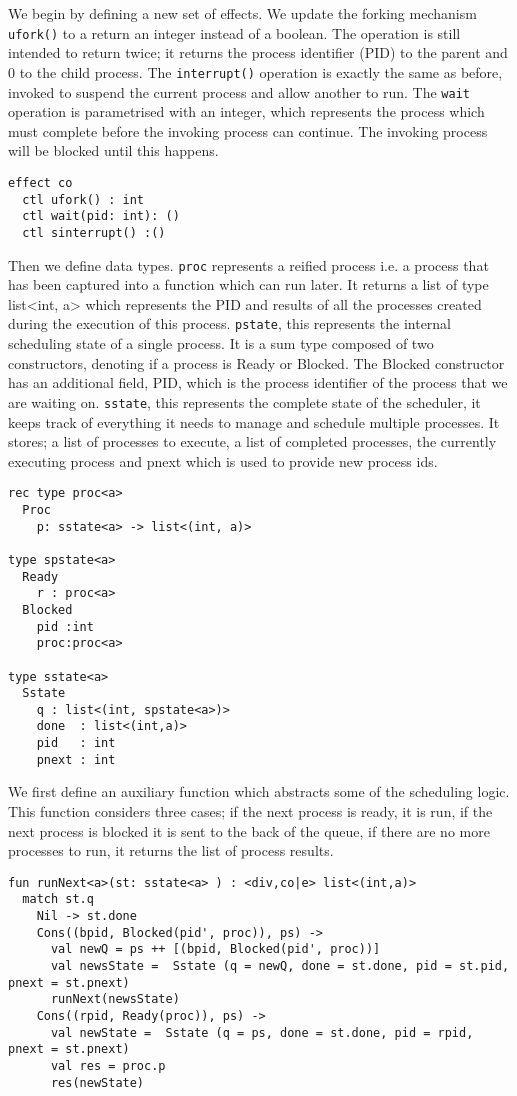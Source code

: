 \documentclass[logo,bsc,singlespacing,parskip]{infthesis}
\begin{document}
We begin by defining a new set of effects. We update the forking mechanism \texttt{ufork()} to a return an integer instead of a boolean. The operation is still intended to return twice; it returns the process identifier (PID) to the parent and 0 to the child process. The \texttt{interrupt()} operation is exactly the same as before, invoked to suspend the current process and allow another to run. The \texttt{wait} operation is parametrised with an integer, which represents the process which must complete before the invoking process can continue. The invoking process will be blocked until this happens.
\begin{lstlisting}
effect co
  ctl ufork() : int
  ctl wait(pid: int): ()
  ctl sinterrupt() :()
\end{lstlisting}


Then we define data types. \texttt{proc} represents a reified process i.e. a process that has been captured into a function which can run later. It returns a list of type list<int, a> which represents the PID and results of all the processes created during the execution of this process.  \texttt{pstate}, this represents the internal scheduling state of a single process. It is a sum type composed of two constructors, denoting if a process is Ready or Blocked. The Blocked constructor has an additional field, PID, which is the process identifier of the process that we are waiting on. \texttt{sstate}, this represents the complete state of the scheduler, it keeps track of everything it needs to manage and schedule multiple processes. It stores; a list of processes to execute, a list of completed processes, the currently executing process and pnext which is used to provide new process ids.
\begin{lstlisting}
rec type proc<a>
  Proc
    p: sstate<a> -> list<(int, a)>

type spstate<a>
  Ready
    r : proc<a>
  Blocked 
    pid :int 
    proc:proc<a>

type sstate<a> 
  Sstate     
    q : list<(int, spstate<a>)>
    done  : list<(int,a)>
    pid   : int
    pnext : int
\end{lstlisting}


We first define an auxiliary function which abstracts some of the scheduling logic. This function considers three cases; if the next process is ready, it is run, if the next process is blocked it is sent to the back of the queue, if there are no more processes to run, it returns the list of process results.

\begin{lstlisting}
fun runNext<a>(st: sstate<a> ) : <div,co|e> list<(int,a)> 
  match st.q
    Nil -> st.done
    Cons((bpid, Blocked(pid', proc)), ps) -> 
      val newQ = ps ++ [(bpid, Blocked(pid', proc))]
      val newsState =  Sstate (q = newQ, done = st.done, pid = st.pid, pnext = st.pnext)
      runNext(newsState) 
    Cons((rpid, Ready(proc)), ps) -> 
      val newState =  Sstate (q = ps, done = st.done, pid = rpid, pnext = st.pnext)
      val res = proc.p
      res(newState)
\end{lstlisting}
\end{document}
